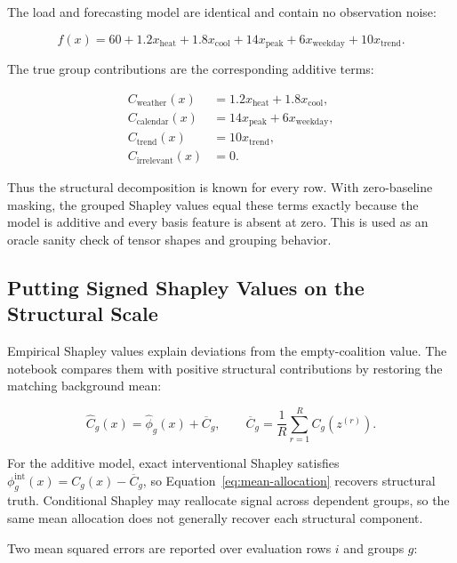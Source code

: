 \documentclass[11pt]{article}
\begin{document}
The load and forecasting model are identical and contain no observation noise:

\begin{equation}
f(x)=60
+1.2x_{\mathrm{heat}}
+1.8x_{\mathrm{cool}}
+14x_{\mathrm{peak}}
+6x_{\mathrm{weekday}}
+10x_{\mathrm{trend}}.
\label{eq:model}
\end{equation}

The true group contributions are the corresponding additive terms:

\begin{align}
C_{\mathrm{weather}}(x)
  &=1.2x_{\mathrm{heat}}+1.8x_{\mathrm{cool}},\\
C_{\mathrm{calendar}}(x)
  &=14x_{\mathrm{peak}}+6x_{\mathrm{weekday}},\\
C_{\mathrm{trend}}(x)&=10x_{\mathrm{trend}},\\
C_{\mathrm{irrelevant}}(x)&=0.
\end{align}

Thus the structural decomposition is known for every row.  With zero-baseline
masking, the grouped Shapley values equal these terms exactly because the model
is additive and every basis feature is absent at zero.  This is used as an
oracle sanity check of tensor shapes and grouping behavior.

\subsection{Putting Signed Shapley Values on the Structural Scale}

Empirical Shapley values explain deviations from the empty-coalition value.
The notebook compares them with positive structural contributions by restoring
the matching background mean:

\begin{equation}
\widehat C_g(x)=\widehat\phi_g(x)+\overline C_g,
\qquad
\overline C_g=\frac{1}{R}\sum_{r=1}^{R}C_g(z^{(r)}).
\label{eq:mean-allocation}
\end{equation}

For the additive model, exact interventional Shapley satisfies
\(\phi_g^{\mathrm{int}}(x)=C_g(x)-\overline C_g\), so
Equation~\eqref{eq:mean-allocation} recovers structural truth.  Conditional
Shapley may reallocate signal across dependent groups, so the same mean
allocation does not generally recover each structural component.

Two mean squared errors are reported over evaluation rows \(i\) and groups
\(g\):
\end{document}
